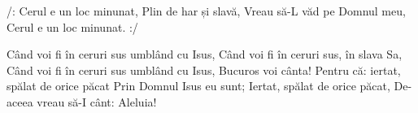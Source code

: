 \beginchorus
/: Cerul e un loc minunat,
Plin de har și slavă,
Vreau să-L văd pe Domnul meu,
Cerul e un loc minunat. :/
\endchorus

\beginverse
Când voi fi în ceruri sus umblând cu Isus,
Când voi fi în ceruri sus, în slava Sa,
Când voi fi în ceruri sus umblând cu Isus,
Bucuros voi cânta!
Pentru că: iertat, spălat de orice păcat
Prin Domnul Isus eu sunt;
Iertat, spălat de orice păcat,
De-aceea vreau să-I cânt: Aleluia!
\endverse
\endsong